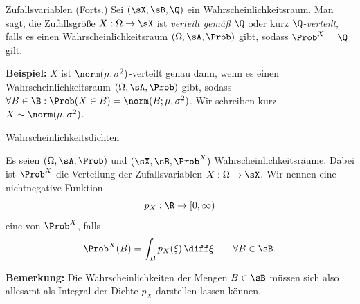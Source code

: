 \begin{frame}{Zufallsvariablen (Forts.)}{}
	Sei $(\sX, \sB, \Q)$ ein Wahrscheinlichkeitsraum. Man sagt, die Zufallsgröße $X : \Omega \rightarrow \sX$ ist
	\textit{verteilt gemäß $\Q$} oder kurz \textit{$\Q$-verteilt}, falls es einen Wahrscheinlichkeitsraum $(\Omega, \sA, \Prob)$ gibt,
	sodass $\Prob^X = \Q$ gilt.
	
	\begin{boxGray}
		\textbf{Beispiel:}
		$X$ ist $\norm(\mu, \sigma^2)$-verteilt genau dann,
		wenn es einen Wahrscheinlichkeitsraum $(\Omega, \sA, \Prob)$ gibt,
		sodass $\forall B \in \B : \Prob(X \in B) = \norm(B; \mu, \sigma^2)$. Wir schreiben kurz $X \sim \norm(\mu, \sigma^2)$.
	\end{boxGray}
\end{frame}


\begin{frame}{Wahrscheinlichkeitsdichten}{}
	\begin{mydef}
		Es seien $(\Omega, \sA, \Prob)$ und $(\sX, \sB, \Prob^X)$ Wahrscheinlichkeitsräume.
		Dabei ist $\Prob^X$ die Verteilung der Zufallsvariablen $X : \Omega \rightarrow \sX$.
		Wir nennen eine nichtnegative Funktion $$p_X : \R \rightarrow [0, \infty)$$ eine 
		von $\Prob^X$, falls
		\begin{equation*}
			\Prob^X(B) = \int_B p_X(\xi)\,\diff\xi \qquad \forall B \in \sB.
		\end{equation*}
	\end{mydef}

	\begin{boxGray}
		\textbf{Bemerkung:} Die Wahrscheinlichkeiten der Mengen $B \in \sB$ müssen sich also allesamt als Integral
		der Dichte $p_X$ darstellen lassen können.
	\end{boxGray}
\end{frame}


